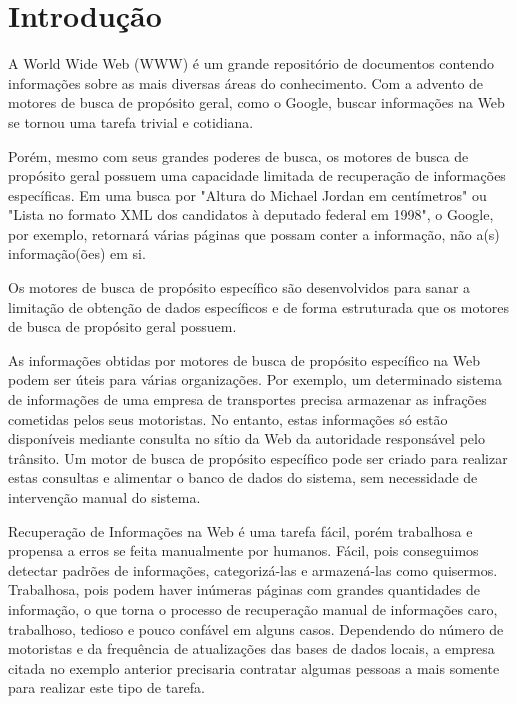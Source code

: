 \chapter{Introdução}
\thispagestyle{fancy}

A World Wide Web (WWW) é um grande repositório de documentos contendo informações sobre as mais diversas áreas do conhecimento. Com a advento de motores de busca de propósito geral, como o Google, buscar informações na Web se tornou uma tarefa trivial e cotidiana.

Porém, mesmo com seus grandes poderes de busca, os motores de busca de propósito geral possuem uma capacidade limitada de recuperação de informações específicas. Em uma busca por "Altura do Michael Jordan em centímetros" ou "Lista no formato XML dos candidatos à deputado federal em 1998", o Google, por exemplo, retornará várias páginas que possam conter a informação, não a(s) informação(ões) em si.

Os motores de busca de propósito específico são desenvolvidos para sanar a limitação de obtenção de dados específicos e de forma estruturada que os motores de busca de propósito geral possuem.

As informações obtidas por motores de busca de propósito específico na Web podem ser úteis para várias organizações. Por exemplo, um determinado sistema de informações de uma empresa de transportes precisa armazenar as infrações cometidas pelos seus motoristas. No entanto, estas informações só estão disponíveis mediante consulta no sítio da Web da autoridade responsável pelo trânsito. Um motor de busca de propósito específico pode ser criado para realizar estas consultas e alimentar o banco de dados do sistema, sem necessidade de intervenção manual do sistema.


Recuperação de Informações na Web é uma tarefa fácil, porém trabalhosa e propensa a erros se feita manualmente por humanos. Fácil, pois conseguimos detectar padrões de informações, categorizá-las e armazená-las como quisermos. Trabalhosa, pois podem haver inúmeras páginas com grandes quantidades de informação, o que torna o processo de recuperação manual de informações caro, trabalhoso, tedioso e pouco confável em alguns casos. Dependendo do número de motoristas e da frequência de atualizações das bases de dados locais, a empresa citada no exemplo anterior precisaria contratar algumas pessoas a mais somente para realizar este tipo de tarefa.

